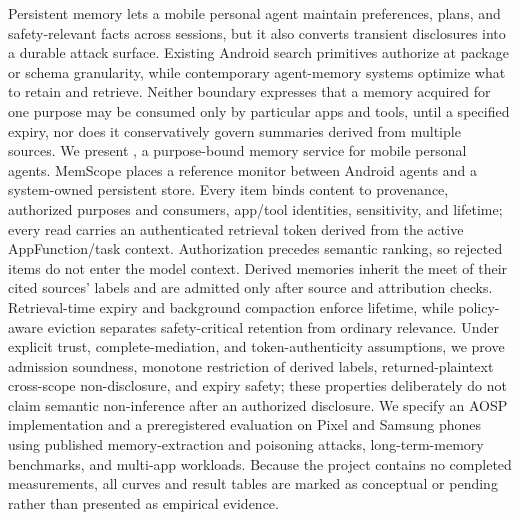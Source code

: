 Persistent memory lets a mobile personal agent maintain preferences, plans, and safety-relevant facts across sessions, but it also converts transient disclosures into a durable attack surface. Existing Android search primitives authorize at package or schema granularity, while contemporary agent-memory systems optimize what to retain and retrieve. Neither boundary expresses that a memory acquired for one purpose may be consumed only by particular apps and tools, until a specified expiry, nor does it conservatively govern summaries derived from multiple sources. We present \ms, a purpose-bound memory service for mobile personal agents. MemScope places a reference monitor between Android agents and a system-owned persistent store. Every item binds content to provenance, authorized purposes and consumers, app/tool identities, sensitivity, and lifetime; every read carries an authenticated retrieval token derived from the active AppFunction/task context. Authorization precedes semantic ranking, so rejected items do not enter the model context. Derived memories inherit the meet of their cited sources' labels and are admitted only after source and attribution checks. Retrieval-time expiry and background compaction enforce lifetime, while policy-aware eviction separates safety-critical retention from ordinary relevance. Under explicit trust, complete-mediation, and token-authenticity assumptions, we prove admission soundness, monotone restriction of derived labels, returned-plaintext cross-scope non-disclosure, and expiry safety; these properties deliberately do not claim semantic non-inference after an authorized disclosure. We specify an AOSP implementation and a preregistered evaluation on Pixel and Samsung phones using published memory-extraction and poisoning attacks, long-term-memory benchmarks, and multi-app workloads. Because the project contains no completed measurements, all curves and result tables are marked as conceptual or pending rather than presented as empirical evidence.
